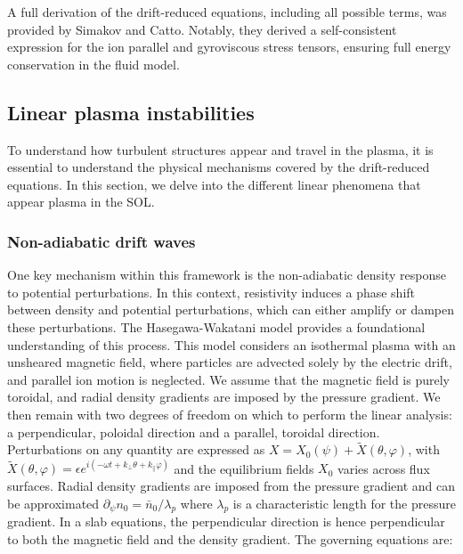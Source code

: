A full derivation of the drift-reduced equations, including all possible terms, was provided by Simakov and Catto\cite{simakov_2003}. Notably, they derived a self-consistent expression for the ion parallel and gyroviscous stress tensors, ensuring full energy conservation in the fluid model.




\subsection{Linear plasma instabilities}
\label{ssec:edge_linearDriftWaves}

To understand how turbulent structures appear and travel in the plasma, it is essential to understand the physical mechanisms covered by the drift-reduced equations. In this section, we delve into the different linear phenomena that appear plasma in the SOL.



\subsubsection{Non-adiabatic drift waves}
\label{ssec:edge_nonAdiabaticResponse}
One key mechanism within this framework is the non-adiabatic density response to potential perturbations. In this context, resistivity induces a phase shift between density and potential perturbations, which can either amplify or dampen these perturbations. The Hasegawa-Wakatani model \cite{hasegawa1983plasma} provides a foundational understanding of this process. This model considers an isothermal plasma with an unsheared magnetic field, where particles are advected solely by the electric drift, and parallel ion motion is neglected. We assume that the magnetic field is purely toroidal, and radial density gradients are imposed by the pressure gradient. We then remain with two degrees of freedom on which to perform the linear analysis: a perpendicular, poloidal direction and a parallel, toroidal direction. Perturbations on any quantity are expressed as $ X = X_0(\psi) + \tilde{X}(\theta,\varphi) $, with $\tilde{X}(\theta,\varphi) = \epsilon e^{i(-\omega t + k_\perp\theta+k_\parallel\varphi )}$ and the equilibrium fields $ X_0 $ varies across flux surfaces. Radial density gradients are imposed from the pressure gradient and can be approximated $\partial_\psi n_0 = \bar{n}_0 / \lambda_p$ where $\lambda_p$ is a characteristic length for the pressure gradient. In a slab equations, the perpendicular direction is hence perpendicular to both the magnetic field and the density gradient. The governing equations are:

